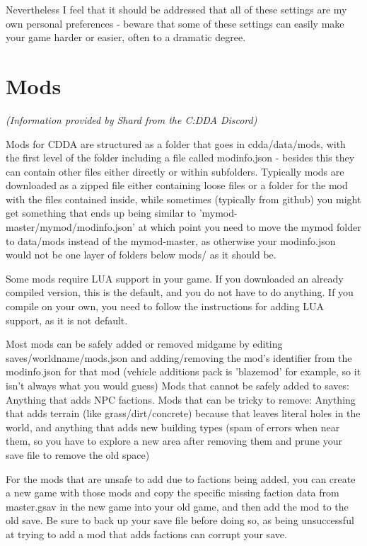 Nevertheless I feel that it should be addressed that all of these settings are my own personal preferences - beware that some of these settings can easily make your game harder or easier, often to a dramatic degree.

\section{Mods}

\textit{(Information provided by Shard from the C:DDA Discord)}

Mods for CDDA are structured as a folder that goes in cdda/data/mods, with the first level of the folder including a file called modinfo.json - besides this they can contain other files either directly or within subfolders.  Typically mods are downloaded as a zipped file either containing loose files or a folder for the mod with the files contained inside, while sometimes (typically from github) you might get something that ends up being similar to 'mymod-master/mymod/modinfo.json' at which point you need to move the mymod folder to data/mods instead of the mymod-master, as otherwise your modinfo.json would not be one layer of folders below mods/ as it should be.

Some mods require LUA support in your game.  If you downloaded an already compiled version, this is the default, and you do not have to do anything.  If you compile on your own, you need to follow the instructions for adding LUA support, as it is not default.

Most mods can be safely added or removed midgame by editing saves/worldname/mods.json and adding/removing the mod's identifier from the modinfo.json for that mod (vehicle additions pack is 'blazemod' for example, so it isn't always what you would guess)  Mods that cannot be safely added to saves: Anything that adds NPC factions.  Mods that can be tricky to remove: Anything that adds terrain (like grass/dirt/concrete) because that leaves literal holes in the world, and anything that adds new building types (spam of errors when near them, so you have to explore a new area after removing them and prune your save file to remove the old space)

For the mods that are unsafe to add due to factions being added, you can create a new game with those mods and copy the specific missing faction data from master.gsav in the new game into your old game, and then add the mod to the old save.  Be sure to back up your save file before doing so, as being unsuccessful at trying to add a mod that adds factions can corrupt your save.

